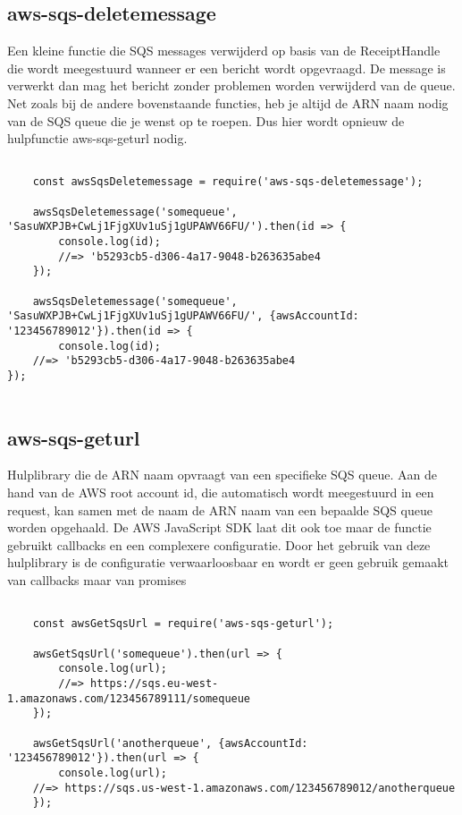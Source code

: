 \subsection{aws-sqs-deletemessage}
Een kleine functie die SQS messages verwijderd op basis van de ReceiptHandle die wordt meegestuurd wanneer er een bericht wordt opgevraagd. De message is verwerkt dan mag het bericht zonder problemen worden verwijderd van de queue. Net zoals bij de andere bovenstaande functies, heb je altijd de ARN naam nodig van de SQS queue die je wenst op te roepen. Dus hier wordt opnieuw de hulpfunctie aws-sqs-geturl nodig.

\begin{lstlisting}[caption=Voorbeeld hoe een bericht wordt verwijderd van SQS nadat het is verwerkt]

	const awsSqsDeletemessage = require('aws-sqs-deletemessage');

	awsSqsDeletemessage('somequeue', 'SasuWXPJB+CwLj1FjgXUv1uSj1gUPAWV66FU/').then(id => {
		console.log(id);
		//=> 'b5293cb5-d306-4a17-9048-b263635abe4
	});

	awsSqsDeletemessage('somequeue', 'SasuWXPJB+CwLj1FjgXUv1uSj1gUPAWV66FU/', {awsAccountId: '123456789012'}).then(id => {
		console.log(id);
	//=> 'b5293cb5-d306-4a17-9048-b263635abe4
});
	
\end{lstlisting}

\subsection{aws-sqs-geturl}
Hulplibrary die de ARN naam opvraagt van een specifieke SQS queue. Aan de hand van de AWS root account id, die automatisch wordt meegestuurd in een request, kan samen met de naam de ARN naam van een bepaalde SQS queue worden opgehaald. De AWS JavaScript SDK laat dit ook toe maar de functie gebruikt callbacks en een complexere configuratie. Door het gebruik van deze hulplibrary is de configuratie verwaarloosbaar en wordt er geen gebruik gemaakt van callbacks maar van promises

\begin{lstlisting}[caption=Voorbeeld hoe de ARN van een SQS wordt opgehaald]

	const awsGetSqsUrl = require('aws-sqs-geturl');

	awsGetSqsUrl('somequeue').then(url => {
		console.log(url);
		//=> https://sqs.eu-west-1.amazonaws.com/123456789111/somequeue
	});

	awsGetSqsUrl('anotherqueue', {awsAccountId: '123456789012'}).then(url => {
		console.log(url);
	//=> https://sqs.us-west-1.amazonaws.com/123456789012/anotherqueue
	});
	
\end{lstlisting}
